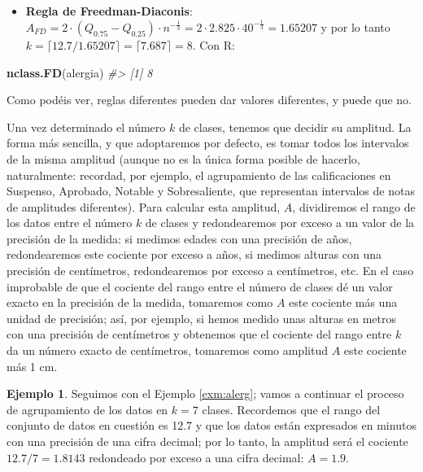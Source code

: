 \documentclass[
]{book}
\newenvironment{Shaded}{\begin{snugshade}}{\end{snugshade}}
\newcommand{\CommentTok}[1]{\textcolor[rgb]{0.56,0.35,0.01}{\textit{#1}}}
\newcommand{\KeywordTok}[1]{\textcolor[rgb]{0.13,0.29,0.53}{\textbf{#1}}}
\newcommand{\NormalTok}[1]{#1}
\providecommand{\tightlist}{%
  \setlength{\itemsep}{0pt}\setlength{\parskip}{0pt}}
\theoremstyle{definition}
\theoremstyle{definition}
\newtheorem{example}{Ejemplo}[chapter]
\theoremstyle{definition}
\theoremstyle{remark}
\begin{document}
\begin{itemize}
\tightlist
\item
  \textbf{Regla de Freedman-Diaconis}: \(A_{FD}= 2 \cdot (Q_{0.75}-Q_{0.25}) \cdot n^{-\frac{1}{3}}=2\cdot 2.825 \cdot 40^{-\frac{1}{3}}=1.65207\) y por lo tanto \(k= \lceil {12.7}/{1.65207}\rceil=\lceil 7.687\rceil=8\). Con R:
\end{itemize}

\begin{Shaded}
\begin{Highlighting}[]
\KeywordTok{nclass.FD}\NormalTok{(alergia)}
\CommentTok{\#\textgreater{} [1] 8}
\end{Highlighting}
\end{Shaded}

Como podéis ver, reglas diferentes pueden dar valores diferentes, y puede que no.

Una vez determinado el número \(k\) de clases, tenemos que decidir su amplitud. La forma más sencilla, y que adoptaremos por defecto, es tomar todos los intervalos de la misma amplitud (aunque no es la única forma posible de hacerlo, naturalmente: recordad, por ejemplo, el agrupamiento de las calificaciones en Suspenso, Aprobado, Notable y Sobresaliente, que representan intervalos de notas de amplitudes diferentes). Para calcular esta amplitud, \(A\), dividiremos el rango de los datos entre el número \(k\) de clases y redondearemos por exceso a un valor de la precisión de la medida: si medimos edades con una precisión de años, redondearemos este cociente por exceso a años, si medimos alturas con una precisión de centímetros, redondearemos por exceso a centímetros, etc. En el caso improbable de que el cociente del rango entre el número de clases dé un valor exacto en la precisión de la medida, tomaremos como \(A\) este cociente más una unidad de precisión; así, por ejemplo, si hemos medido unas alturas en metros con una precisión de centímetros y obtenemos que el cociente del rango entre \(k\) da un número exacto de centímetros, tomaremos como amplitud \(A\) este cociente más 1 cm.

\begin{example}
\protect\hypertarget{exm:unnamed-chunk-9}{}{\label{exm:unnamed-chunk-9} }Seguimos con el Ejemplo \ref{exm:alerg}; vamos a continuar el proceso de agrupamiento de los datos en \(k=7\) clases.
Recordemos que el rango del conjunto de datos en cuestión es 12.7 y que los datos están expresados en minutos
con una precisión de una cifra decimal; por lo tanto, la amplitud será el cociente \(12.7/7=1.8143\) redondeado
por exceso a una cifra decimal: \(A=1.9\).
\end{example}
\end{document}

